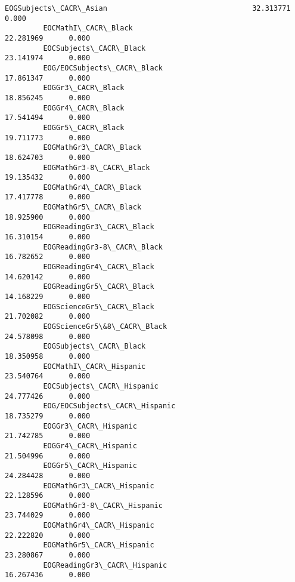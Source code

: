 \documentclass[11pt]{article}
\begin{document}
\begin{Verbatim}[commandchars=\\\{\}]
         EOGSubjects\_CACR\_Asian                                  32.313771      0.000   
         EOCMathI\_CACR\_Black                                     22.281969      0.000   
         EOCSubjects\_CACR\_Black                                  23.141974      0.000   
         EOG/EOCSubjects\_CACR\_Black                              17.861347      0.000   
         EOGGr3\_CACR\_Black                                       18.856245      0.000   
         EOGGr4\_CACR\_Black                                       17.541494      0.000   
         EOGGr5\_CACR\_Black                                       19.711773      0.000   
         EOGMathGr3\_CACR\_Black                                   18.624703      0.000   
         EOGMathGr3-8\_CACR\_Black                                 19.135432      0.000   
         EOGMathGr4\_CACR\_Black                                   17.417778      0.000   
         EOGMathGr5\_CACR\_Black                                   18.925900      0.000   
         EOGReadingGr3\_CACR\_Black                                16.310154      0.000   
         EOGReadingGr3-8\_CACR\_Black                              16.782652      0.000   
         EOGReadingGr4\_CACR\_Black                                14.620142      0.000   
         EOGReadingGr5\_CACR\_Black                                14.168229      0.000   
         EOGScienceGr5\_CACR\_Black                                21.702082      0.000   
         EOGScienceGr5\&8\_CACR\_Black                              24.578098      0.000   
         EOGSubjects\_CACR\_Black                                  18.350958      0.000   
         EOCMathI\_CACR\_Hispanic                                  23.540764      0.000   
         EOCSubjects\_CACR\_Hispanic                               24.777426      0.000   
         EOG/EOCSubjects\_CACR\_Hispanic                           18.735279      0.000   
         EOGGr3\_CACR\_Hispanic                                    21.742785      0.000   
         EOGGr4\_CACR\_Hispanic                                    21.504996      0.000   
         EOGGr5\_CACR\_Hispanic                                    24.284428      0.000   
         EOGMathGr3\_CACR\_Hispanic                                22.128596      0.000   
         EOGMathGr3-8\_CACR\_Hispanic                              23.744029      0.000   
         EOGMathGr4\_CACR\_Hispanic                                22.222820      0.000   
         EOGMathGr5\_CACR\_Hispanic                                23.280867      0.000   
         EOGReadingGr3\_CACR\_Hispanic                             16.267436      0.000   

\end{Verbatim}
\end{document}
